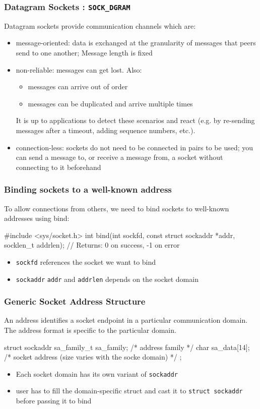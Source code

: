\documentclass[newPxFont,sthlmFooter,nooffset]{beamer}
\begin{document}
\begin{frame}[t, fragile]
  \frametitle{Datagram Sockets : \texttt{SOCK\_DGRAM}}
Datagram sockets provide communication channels which are:
\begin{itemize}
\item message-oriented: data is exchanged at the granularity of messages that peers send to one another; Message length is fixed
\item non-reliable: messages can get lost. Also:
  \begin{itemize}
  \item messages can arrive out of order
  \item messages can be duplicated and arrive multiple times
  \end{itemize}
  It is up to applications to detect these scenarios and react
  (e.g. by re-sending messages after a timeout, adding sequence
  numbers, etc.).
\item connection-less: sockets do not need to be connected in pairs to be used; you can send a message to, or receive a message from, a socket without connecting to it beforehand
\end{itemize}

\end{frame}


\begin{frame}[t, fragile]
  \frametitle{Binding sockets to a well-known address}
To allow connections from others, we need to bind sockets to well-known addresses using bind:
\begin{codedef}
#include <sys/socket.h>
int bind(int sockfd, const struct sockaddr *addr, socklen_t addrlen);
// Returns: 0 on success, -1 on error
\end{codedef}
\begin{itemize}
\item \texttt{sockfd} references the socket we want to bind
\item \texttt{sockaddr} \texttt{addr} and \texttt{addrlen} depends on the socket domain
\end{itemize}
\end{frame}


\begin{frame}[t, fragile]
  \frametitle{Generic Socket Address Structure}
An address identifies a socket endpoint in a particular communication domain. The address format is specific to the particular domain.

\begin{codedefnb}
 struct sockaddr {
     sa_family_t  sa_family;    /* address family */
     char         sa_data[14];  /* socket address (size varies with the socke domain) */
};
\end{codedefnb}
\begin{itemize}
\item Each socket domain has its own variant of \texttt{sockaddr}
\item user has to fill the domain-specific struct and cast it to \texttt{struct sockaddr} before passing it to bind
\end{itemize}
\end{frame}
\end{document}
